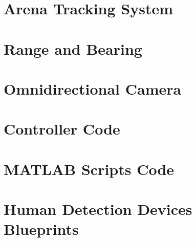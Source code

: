 \documentclass[oneside, a4paper, 12pt]{memoir}
\begin{document}
\chapter{Arena Tracking System}

\chapter{Range and Bearing}

\chapter{Omnidirectional Camera}

\chapter{Controller Code}

\chapter{MATLAB Scripts Code}

\chapter{Human Detection Devices Blueprints}

\backmatter
\newpage

\end{document}
